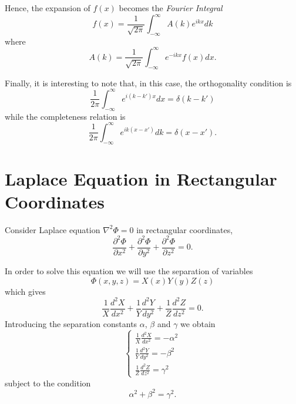 Hence, the expansion of $f(x)$ becomes the \textit{Fourier Integral}
\begin{equation}
f(x) = \frac{1}{\sqrt{2\pi}} \int_{-\infty} ^\infty A(k) e^{ikx} dk
\end{equation}
where
\begin{equation}
A(k) = \frac{1}{\sqrt{2\pi}} \int_{-\infty} ^\infty  e^{-ikx} f(x) dx.
\end{equation}

Finally, it is interesting to note that, in this case, the orthogonality condition is 
\begin{equation}
 \frac{1}{2\pi } \int_{-\infty} ^\infty  e^{i(k-k')x} dx = \delta (k-k')
\end{equation}
while the completeness relation is
\begin{equation}
 \frac{1}{2\pi } \int_{-\infty} ^\infty  e^{ik(x-x')} dk = \delta (x-x').
\end{equation}

\section{Laplace Equation in Rectangular Coordinates}
Consider Laplace equation $\nabla^2 \Phi = 0 $ in rectangular coordinates,
\begin{equation}
\frac{\partial^2 \Phi}{\partial x^2} + \frac{\partial^2 \Phi}{\partial y^2} + \frac{\partial^2 \Phi}{\partial z^2} = 0.
\end{equation}

In order to solve this equation we will use the separation of variables
\begin{equation}
\Phi (x,y,z) = X(x) Y(y) Z(z)
\end{equation}
which gives 
\begin{equation}
\frac{1}{X} \frac{d^2 X}{dx^2} + \frac{1}{Y} \frac{d^2 Y}{dy^2} + \frac{1}{Z} \frac{d^2 Z}{dz^2} = 0.
\end{equation}
Introducing the separation constants $\alpha$, $\beta$ and $\gamma$ we obtain
\begin{equation}
\begin{cases}
\frac{1}{X} \frac{d^2 X}{dx^2} = -\alpha^2  \\
\frac{1}{Y} \frac{d^2 Y}{dy^2} = -\beta^2  \\ 
\frac{1}{Z} \frac{d^2 Z}{dz^2} = \gamma^2
\end{cases}
\end{equation}
subject to the condition
\begin{equation}
\alpha^2 + \beta^2 = \gamma^2 .
\end{equation}

